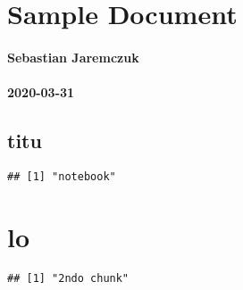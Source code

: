 \hypertarget{TOC}{}

\hypertarget{header}{}
\hypertarget{sample-document}{%
\section{Sample Document}\label{sample-document}}

\hypertarget{sebastian-jaremczuk}{%
\paragraph{Sebastian Jaremczuk}\label{sebastian-jaremczuk}}

\hypertarget{section}{%
\paragraph{2020-03-31}\label{section}}

\hypertarget{titu}{}
\hypertarget{titu}{%
\subsection{titu}\label{titu}}

\begin{Shaded}
\begin{Highlighting}[]
\NormalTok{(}\NormalTok{)}
\end{Highlighting}
\end{Shaded}

\begin{verbatim}
## [1] "notebook"
\end{verbatim}

\hypertarget{lo}{}
\hypertarget{lo}{%
\section{lo}\label{lo}}

\begin{Shaded}
\begin{Highlighting}[]
\NormalTok{(}\NormalTok{)}
\end{Highlighting}
\end{Shaded}

\begin{verbatim}
## [1] "2ndo chunk"
\end{verbatim}
